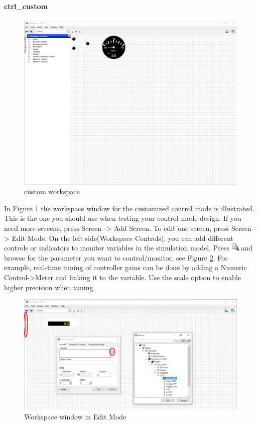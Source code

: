 \paragraph{ctrl\_custom}
\begin{figure}[htb!]
	\centering
	\includegraphics[width=\linewidth]{fig/CSAD_workspace_custom}
	\caption{custom workspace}
	\label{fig:workspace_custom}
\end{figure}
In Figure \ref{fig:workspace_custom} the workspace window for the customized control mode is illustrated. This is the one you should use when testing your control mode design. If you need more screens, press Screen -> Add Screen. To edit one screen, press Screen -> Edit Mode. On the left side(Workspace Controls), you can add different controls or indicators to monitor variables in the simulation model. Press \includegraphics{fig/magnifying_glass.png} and browse for the parameter you want to control/monitor, see Figure \ref{fig:workspace}. For example, real-time tuning of controller gains can be done by adding a Numeric Control->Meter and linking it to the variable. Use the scale option to enable higher precision when tuning. 
\begin{figure}[htb!]
	\centering
	\includegraphics[scale=0.4]{fig/workspace_edit.png}
	\caption{Workspace window in Edit Mode}
	\label{fig:workspace}
\end{figure}
